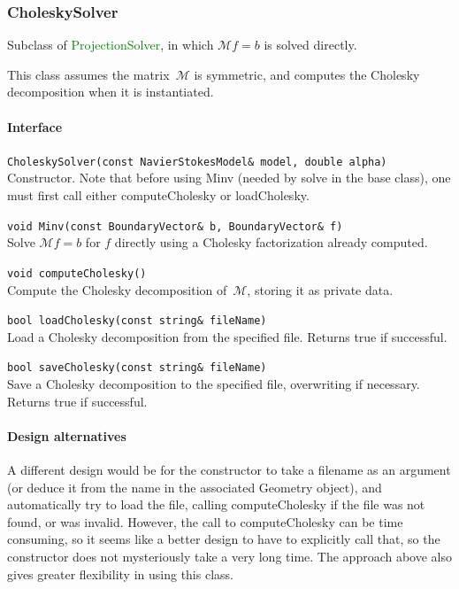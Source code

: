 \documentclass[11pt]{article}
\def\class#1{\textcolor{green}{\ttfamily\small #1}} %
\def\fn#1{{\ttfamily\small #1}} %
\let\code\lstinline
\begin{document}
\subsubsection{CholeskySolver}
Subclass of \class{ProjectionSolver}, in which $\mathcal{M}f=b$ is solved directly.

This class assumes the matrix~$\mathcal{M}$ is symmetric, and computes the Cholesky decomposition when it is instantiated.

\paragraph{Interface}
\begin{description}
	\item \code|CholeskySolver(const NavierStokesModel& model, double alpha)|\\
		Constructor.  Note that before using \fn{Minv} (needed by \fn{solve} in the base class), one must first call either \fn{computeCholesky} or \fn{loadCholesky}.
	\item \code|void Minv(const BoundaryVector& b, BoundaryVector& f)|\\
		Solve $\mathcal{M}f = b$ for $f$ directly using a Cholesky factorization already computed.
	\item \code|void computeCholesky()|\\
		Compute the Cholesky decomposition of~$\mathcal{M}$, storing it as private data.
	\item \code|bool loadCholesky(const string& fileName)|\\
		Load a Cholesky decomposition from the specified file.  Returns true if successful.
	\item \code|bool saveCholesky(const string& fileName)|\\
		Save a Cholesky decomposition to the specified file, overwriting if necessary.  Returns true if successful.
\end{description}

\paragraph{Design alternatives}
A different design would be for the constructor to take a filename as an argument (or deduce it from the name in the associated Geometry object), and automatically try to load the file, calling \fn{computeCholesky} if the file was not found, or was invalid.  However, the call to \fn{computeCholesky} can be time consuming, so it seems like a better design to have to explicitly call that, so the constructor does not mysteriously take a very long time.  The approach above also gives greater flexibility in using this class.
\end{document}
